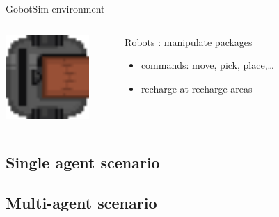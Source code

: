 \begin{frame}{GobotSim environment}
    \begin{columns}
        \begin{column}{0.2\textwidth}
            \includegraphics[width = 0.8\textwidth]{images/godot/robot_texture.png}
        \end{column}
        \begin{column}{0.7\textwidth}
            Robots : manipulate packages
            \begin{itemize}
                \item commands: move, pick, place,\dots
                \item recharge at recharge areas
            \end{itemize}
        \end{column}
    \end{columns}
\end{frame}

\subsection{Single agent scenario}



\subsection{Multi-agent scenario}







